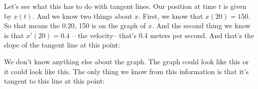 \documentclass[pdftex, brazil, 12pt, twoside]{article}
\begin{document}
\begin{figure}[H]
  \begin{center}
  \end{center}
\end{figure}

Let's see what this has to do with tangent lines.
Our position at time $t$ is given by $x(t)$.
And we know two things about $x$.
First, we know that $x(20) = 150$.
So that means the 0.20, 150 is on the graph of $x$.
And the second thing we know is that $x'(20) = 0.4$
-- the velocity-- that's 0.4 meters per second.
And that's the slope of the tangent line at this point:

\begin{figure}[H]
  \begin{center}
  \end{center}
\end{figure}

We don't know anything else about the graph.
The graph could look like this or it could look like this.
The only thing we know from this information
is that it's tangent to this line at this point:
\end{document}
